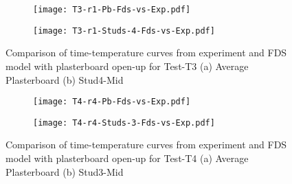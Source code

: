 \begin{figure}[!htbp]
	\centering
	\begin{subfigure}[b]{0.7\textwidth}
		\centering
		\texttt{[image: T3-r1-Pb-Fds-vs-Exp.pdf]}
		\caption{}
		\label{subfig:T3-r1-Pb-Fds-vs-Exp}
	\end{subfigure}
	\begin{subfigure}[b]{0.6\textwidth}
		\centering
		\texttt{[image: T3-r1-Studs-4-Fds-vs-Exp.pdf]}
		\caption{}
		\label{subfig:T3-r0-Studs-4-Fds-vs-Exp}
	\end{subfigure}
	   \caption{Comparison of time-temperature curves from experiment and FDS model with plasterboard open-up for Test-T3 (a) Average Plasterboard (b) Stud4-Mid}
	   \label{fig:T3-fds-output-pbop}
\end{figure}
\begin{figure}[!htbp]
	\centering
	\begin{subfigure}[b]{0.7\textwidth}
		\centering
		\texttt{[image: T4-r4-Pb-Fds-vs-Exp.pdf]}
		\caption{}
		\label{subfig:T4-r4-Pb-Fds-vs-Exp}
	\end{subfigure}
	\begin{subfigure}[b]{0.6\textwidth}
		\centering
		\texttt{[image: T4-r4-Studs-3-Fds-vs-Exp.pdf]}
		\caption{}
		\label{subfig:T4-r4-Studs-3-Fds-vs-Exp}
	\end{subfigure}
	   \caption{Comparison of time-temperature curves from experiment and FDS model with plasterboard open-up for Test-T4 (a) Average Plasterboard (b) Stud3-Mid}
	   \label{fig:T4-fds-output-pbop}
\end{figure}

